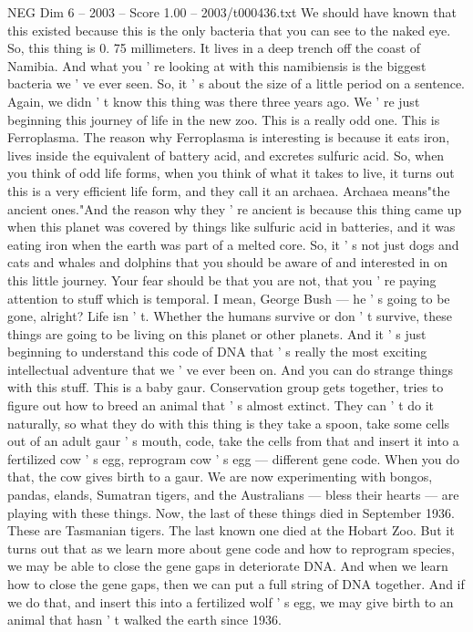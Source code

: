 \begin{textsample}{NEG Dim 6 – 2003 – Score 1.00 – 2003/t000436.txt}
We should have known that this existed because this is the only bacteria that you can see to the naked eye.
So, this thing is 0. 75 millimeters.
It lives in a deep trench off the coast of Namibia.
And what you ' re looking at with this namibiensis is the biggest bacteria we ' ve ever seen.
So, it ' s about the size of a little period on a sentence.
Again, we didn ' t know this thing was there three years ago.
We ' re just beginning this journey of life in the new zoo.
This is a really odd one.
This is Ferroplasma.
The reason why Ferroplasma is interesting is because it eats iron, lives inside the equivalent of battery acid, and excretes sulfuric acid.
So, when you think of odd life forms, when you think of what it takes to live, it turns out this is a very efficient life form, and they call it an archaea.
Archaea means"the ancient ones."And the reason why they ' re ancient is because this thing came up when this planet was covered by things like sulfuric acid in batteries, and it was eating iron when the earth was part of a melted core.
So, it ' s not just dogs and cats and whales and dolphins that you should be aware of and interested in on this little journey.
Your fear should be that you are not, that you ' re paying attention to stuff which is temporal.
I mean, George Bush — he ' s going to be gone, alright?
Life isn ' t.
Whether the humans survive or don ' t survive, these things are going to be living on this planet or other planets.
And it ' s just beginning to understand this code of DNA that ' s really the most exciting intellectual adventure that we ' ve ever been on.
And you can do strange things with this stuff.
This is a baby gaur.
Conservation group gets together, tries to figure out how to breed an animal that ' s almost extinct.
They can ' t do it naturally, so what they do with this thing is they take a spoon, take some cells out of an adult gaur ' s mouth, code, take the cells from that and insert it into a fertilized cow ' s egg, reprogram cow ' s egg — different gene code.
When you do that, the cow gives birth to a gaur.
We are now experimenting with bongos, pandas, elands, Sumatran tigers, and the Australians — bless their hearts — are playing with these things.
Now, the last of these things died in September 1936.
These are Tasmanian tigers.
The last known one died at the Hobart Zoo.
But it turns out that as we learn more about gene code and how to reprogram species, we may be able to close the gene gaps in deteriorate DNA.
And when we learn how to close the gene gaps, then we can put a full string of DNA together.
And if we do that, and insert this into a fertilized wolf ' s egg, we may give birth to an animal that hasn ' t walked the earth since 1936.

\end{textsample}
